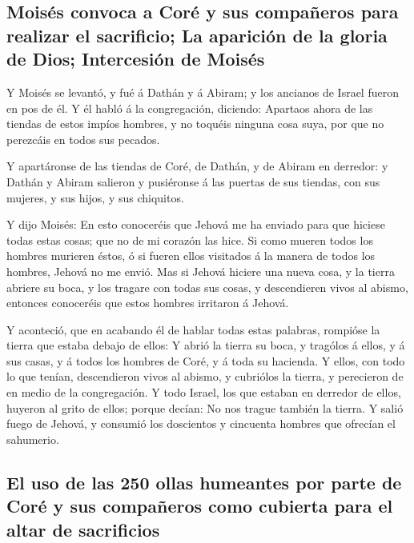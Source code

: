 \hypertarget{moisuxe9s-convoca-a-coruxe9-y-sus-compauxf1eros-para-realizar-el-sacrificio-la-apariciuxf3n-de-la-gloria-de-dios-intercesiuxf3n-de-moisuxe9s-1}{%
\subsection{Moisés convoca a Coré y sus compañeros para realizar el
sacrificio; La aparición de la gloria de Dios; Intercesión de
Moisés}\label{moisuxe9s-convoca-a-coruxe9-y-sus-compauxf1eros-para-realizar-el-sacrificio-la-apariciuxf3n-de-la-gloria-de-dios-intercesiuxf3n-de-moisuxe9s-1}}

 Y Moisés se levantó, y fué á Dathán y á Abiram; y los
ancianos de Israel fueron en pos de él.  Y él habló á la
congregación, diciendo: Apartaos ahora de las tiendas de estos impíos
hombres, y no toquéis ninguna cosa suya, por que no perezcáis en todos
sus pecados.

 Y apartáronse de las tiendas de Coré, de Dathán, y de
Abiram en derredor: y Dathán y Abiram salieron y pusiéronse á las
puertas de sus tiendas, con sus mujeres, y sus hijos, y sus chiquitos.

 Y dijo Moisés: En esto conoceréis que Jehová me ha enviado
para que hiciese todas estas cosas; que no de mi corazón las hice.
 Si como mueren todos los hombres murieren éstos, ó si
fueren ellos visitados á la manera de todos los hombres, Jehová no me
envió.  Mas si Jehová hiciere una nueva cosa, y la tierra
abriere su boca, y los tragare con todas sus cosas, y descendieren vivos
al abismo, entonces conoceréis que estos hombres irritaron á Jehová.

 Y aconteció, que en acabando él de hablar todas estas
palabras, rompióse la tierra que estaba debajo de ellos:  Y
abrió la tierra su boca, y tragólos á ellos, y á sus casas, y á todos
los hombres de Coré, y á toda su hacienda.  Y ellos, con
todo lo que tenían, descendieron vivos al abismo, y cubriólos la tierra,
y perecieron de en medio de la congregación.  Y todo
Israel, los que estaban en derredor de ellos, huyeron al grito de ellos;
porque decían: No nos trague también la tierra.  Y salió
fuego de Jehová, y consumió los doscientos y cincuenta hombres que
ofrecían el sahumerio.

\hypertarget{el-uso-de-las-250-ollas-humeantes-por-parte-de-coruxe9-y-sus-compauxf1eros-como-cubierta-para-el-altar-de-sacrificios}{%
\subsection{El uso de las 250 ollas humeantes por parte de Coré y sus
compañeros como cubierta para el altar de
sacrificios}\label{el-uso-de-las-250-ollas-humeantes-por-parte-de-coruxe9-y-sus-compauxf1eros-como-cubierta-para-el-altar-de-sacrificios}}

